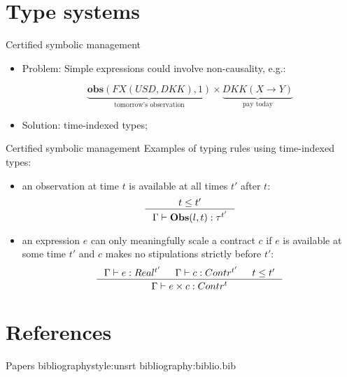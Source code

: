 \documentclass[aspectratio=169]{beamer}
\newcommand{\describe}[2]{\underbrace{#1}_{\text{#2}}}
\begin{document}
\section{Type systems}
\label{sec:org59a69e8}
\begin{frame}[label={sec:org7d7b7f4}]{Certified symbolic management}
\begin{itemize}
\item \alert{Problem}: Simple expressions could involve non-causality, e.g.:

$$\describe{\textbf{obs}(FX(USD, DKK), 1)}{tomorrow's observation} \times \describe{DKK(X \rightarrow Y)}{pay today}$$

\item \alert{Solution}: time-indexed types;
\end{itemize}
\end{frame}

\begin{frame}[label={sec:org31235a5}]{Certified symbolic management}
\alert{Examples} of typing rules using time-indexed types:

\begin{itemize}
\item an observation at time \(t\) is available at all times \(t'\) after \(t\):
$$\inference{t \leq t'}{\Gamma |- \textbf{Obs}(l,t) : \tau^{t'}}$$

\item an expression \(e\) can only meaningfully scale a contract \(c\) if \(e\) is
available at some time \(t'\) and \(c\) makes no stipulations strictly before
\(t'\): $$\inference{\Gamma |- e: Real^{t'} & \Gamma |- c: Contr^{t'} & t \leq t'}{\Gamma |- e \times c:
  Contr^t}$$
\end{itemize}
\end{frame}




\section{References}
\label{sec:orgec5be88}
\begin{frame}[label={sec:org48e87ed}]{Papers}
bibliographystyle:unsrt
bibliography:biblio.bib
\end{frame}
\end{document}
